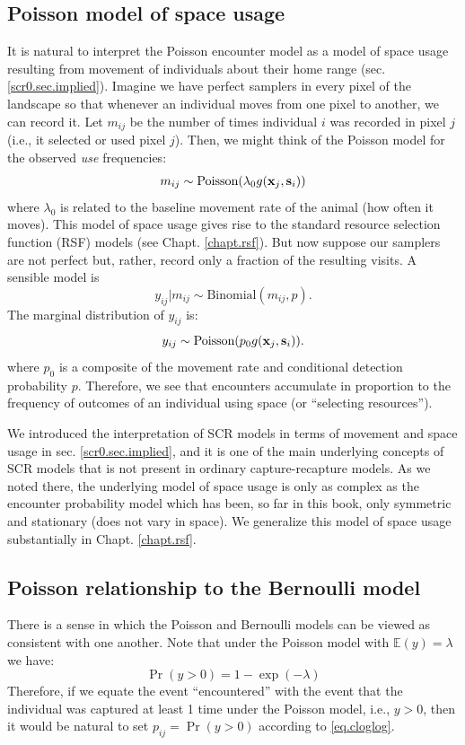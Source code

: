 \subsection{Poisson model of space usage}

It is natural to interpret the Poisson encounter model as a model of
space usage resulting from movement of individuals about their home
range (sec. \ref{scr0.sec.implied}).  Imagine we have
perfect samplers in every pixel of the landscape so that whenever an
individual moves from one pixel to another, we can record it.  Let
$m_{ij}$ be the number of times individual $i$ was recorded in pixel
$j$ (i.e., it selected or used pixel $j$). Then, we might think of the
Poisson model for the observed {\it use} frequencies:
\[
m_{ij} \sim  \mbox{Poisson}( \lambda_{0} g({\bf x}_{j},{\bf s}_{i}) )
\]
where $\lambda_{0}$ is related to the baseline movement rate of the
animal (how often it moves). This model of space usage gives rise to
the standard resource selection function (RSF) models (see
Chapt. \ref{chapt.rsf}).  But now suppose our samplers are not perfect
but, rather, record only a fraction of the resulting visits. A
sensible model is
\[
 y_{ij}|m_{ij} \sim \mbox{Binomial}(m_{ij}, p).
\]
The marginal distribution of $y_{ij}$ is:
\[
 y_{ij} \sim \mbox{Poisson}(p_{0} g({\bf x}_{j},{\bf s}_{i}) ).
\]
where $p_0$ is a composite of the movement rate and conditional
detection probability $p$. Therefore, we see that encounters
accumulate in proportion to the frequency of outcomes of an individual
using space (or ``selecting resources'').

We introduced the interpretation of SCR models in terms of movement
and space usage in sec. \ref{scr0.sec.implied}, and it is one of the
main underlying concepts of SCR models that is not present in ordinary
capture-recapture models. As we noted there, the underlying model of
space usage is only as complex as the encounter probability model
which has been, so far in this book, only symmetric and stationary
(does not vary in space). We generalize this model of space usage
substantially in Chapt. \ref{chapt.rsf}.



\subsection{Poisson relationship to the Bernoulli model}
\label{poisson-mn.sec.approx}

There is a sense in which the Poisson and Bernoulli models can be
viewed as consistent with one another. Note that under the Poisson
model with $\mathbb{E}(y) = \lambda$ we have:
\begin{equation}
 \Pr(y>0) = 1-\exp(-\lambda)
\label{eq.cloglog}
\end{equation}
Therefore, if we equate the event ``encountered'' with the event that
the individual was captured at least 1 time under the Poisson model,
i.e., $y>0$, then it would be natural to set $p_{ij} = \Pr(y>0)$
according to \ref{eq.cloglog}.


